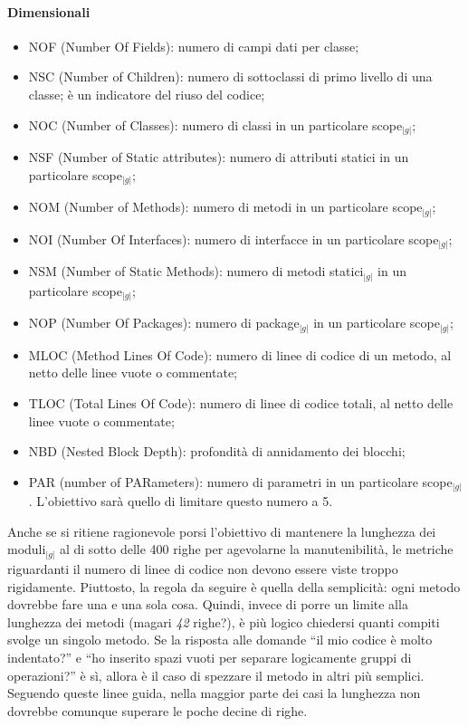 {\paragraph{Dimensionali}\hbox{}
    \begin{itemize}
	\item NOF (Number Of Fields): numero di campi dati per classe;
	\item NSC (Number of Children): numero di sottoclassi di primo livello di una classe; è un indicatore del riuso del codice;
	\item NOC (Number of Classes): numero di classi in un particolare scope$_{|g|}$;
	\item NSF (Number of Static attributes): numero di attributi statici in un particolare scope$_{|g|}$;
	\item NOM (Number of Methods): numero di metodi in un particolare scope$_{|g|}$;
	\item NOI (Number Of Interfaces): numero di interfacce in un particolare scope$_{|g|}$;
	\item NSM (Number of Static Methods): numero di metodi statici$_{|g|}$ in un particolare scope$_{|g|}$;
	\item NOP (Number Of Packages): numero di package$_{|g|}$ in un particolare scope$_{|g|}$;
	\item MLOC (Method Lines Of Code): numero di linee di codice di un metodo, al netto delle linee vuote o commentate;
	\item TLOC (Total Lines Of Code): numero di linee di codice totali, al netto delle linee vuote o commentate;
	\item NBD (Nested Block Depth): profondità di annidamento dei blocchi;
	\item PAR (number of PARameters): numero di parametri in un particolare scope$_{|g|}$. L’obiettivo sarà quello di limitare questo numero a 5.
    \end{itemize}
    Anche se si ritiene ragionevole porsi l’obiettivo di mantenere la lunghezza dei moduli$_{|g|}$ al di sotto delle 400 righe per agevolarne la manutenibilità, le metriche riguardanti il numero 
    di linee di codice non devono essere viste troppo rigidamente. Piuttosto, la regola da seguire è quella della semplicità: ogni metodo dovrebbe fare una e una sola cosa. Quindi, invece di 
    porre un limite alla lunghezza dei metodi (magari \textit{42} righe?), è più logico chiedersi quanti compiti svolge un singolo metodo. Se la risposta alle domande “il mio codice è molto indentato?” e “ho inserito spazi vuoti per separare logicamente gruppi di operazioni?” è sì, allora è il caso di spezzare il metodo in altri più semplici. Seguendo queste linee guida, nella maggior parte dei casi la lunghezza non dovrebbe comunque superare le poche decine di righe.


}
